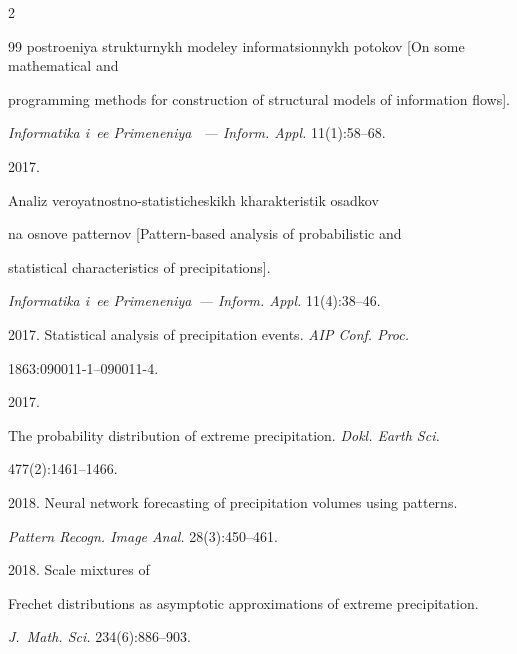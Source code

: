 \begin{multicols}{2}
{{\begin{thebibliography}{99}
postroeniya strukturnykh modeley informatsionnykh potokov [On some mathematical and


programming methods for construction of structural models of information flows]. 


\textit{Informatika i~ee Primeneniya ~--- Inform. Appl.} 11(1):58--68.







 2017. 


Analiz veroyatnostno-statisticheskikh kharakteristik osadkov 


na osnove patternov [Pattern-based analysis of probabilistic and 


statistical characteristics of precipitations]. 


\textit{Informatika i~ee Primeneniya~--- Inform. Appl.} 11(4):38--46.









2017. Statistical analysis of precipitation events. \textit{AIP Conf. Proc.} 


1863:\mbox{090011-1}--\mbox{090011-4}.







 2017. 


The probability distribution of extreme precipitation. \textit{Dokl. Earth Sci.} 


477(2):1461--1466.









 2018. Neural network forecasting of precipitation volumes using patterns. 


 \textit{Pattern Recogn. Image Anal.} 28(3):450--461.







 2018. Scale mixtures of


Frechet distributions as asymptotic approximations of extreme precipitation. 


\textit{J.~Math. Sci.} 234(6):886--903.


\end{thebibliography}





 }


 }





\end{multicols}





